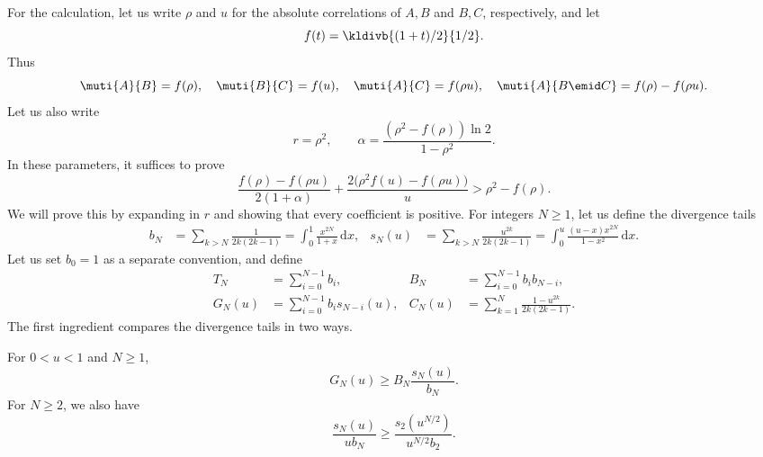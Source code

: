 For the calculation, let us write $\rho$ and $u$ for the absolute
correlations of $A,B$ and $B,C$, respectively, and let
\begin{equation*}
  f(t)=\kldivb{(1+t)/2}{1/2}.
\end{equation*}
Thus
\begin{equation*}
  \muti{A}{B}=f(\rho),\quad
  \muti{B}{C}=f(u),\quad
  \muti{A}{C}=f(\rho u),\quad
  \muti{A}{B\emid C}=f(\rho)-f(\rho u).
\end{equation*}
Let us also write
\begin{equation*}
  r=\rho^2,\qquad
  \alpha=\frac{(\rho^2-f(\rho))\ln2}{1-\rho^2}.
\end{equation*}
In these parameters, it suffices to prove
\begin{equation}
  \label{eq:three-bit-scalar-target}
  \frac{f(\rho)-f(\rho u)}{2(1+\alpha)}
  +\frac{2\bigl(\rho^2 f(u)-f(\rho u)\bigr)}u
  >\rho^2-f(\rho).
\end{equation}
We will prove this by expanding in $r$ and showing that every
coefficient is positive. For integers $N\ge1$, let us define the divergence tails
\begin{align*}
  b_N&=\sum_{k>N}\frac{1}{2k(2k-1)}
  =\int_0^1\frac{x^{2N}}{1+x}\,\mathrm{d}x,
  &s_N(u)&=\sum_{k>N}\frac{u^{2k}}{2k(2k-1)}
  =\int_0^u\frac{(u-x)x^{2N}}{1-x^2}\,\mathrm{d}x.
\end{align*}
Let us set $b_0=1$ as a separate convention, and define
\begin{align*}
  T_N&=\sum_{i=0}^{N-1}b_i,
  &B_N&=\sum_{i=0}^{N-1}b_i b_{N-i},\\
  G_N(u)&=\sum_{i=0}^{N-1}b_i s_{N-i}(u),
  &C_N(u)&=\sum_{k=1}^N\frac{1-u^{2k}}{2k(2k-1)}.
\end{align*}
The first ingredient compares the divergence tails in two ways.
\begin{lemma}
\label{lem:scalar-tail-order}
For $0<u<1$ and $N\ge1$,
\begin{equation}
  \label{eq:scalar-convolution-order}
  G_N(u)\ge B_N\frac{s_N(u)}{b_N}.
\end{equation}
For $N\ge2$, we also have
\begin{equation}
  \label{eq:scalar-rescaled-order}
  \frac{s_N(u)}{u b_N}\ge\frac{s_2(u^{N/2})}{u^{N/2} b_2}.
\end{equation}
\end{lemma}
